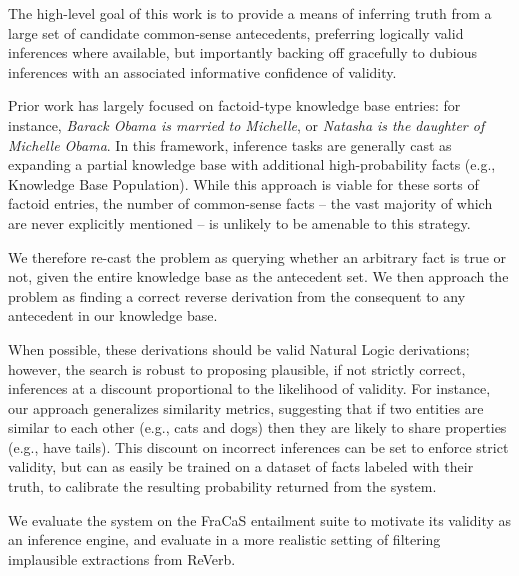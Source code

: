 The high-level goal of this work is to provide a means of inferring
  truth from a large set of candidate common-sense antecedents,
  preferring logically
  valid inferences where available, but importantly backing off
  gracefully to dubious inferences with an associated informative
  confidence of validity.

Prior work has largely focused on factoid-type knowledge base entries:
  for instance, \textit{Barack Obama is married to Michelle}, or
  \textit{Natasha is the daughter of Michelle Obama}.
In this framework, inference tasks are generally cast as expanding
  a partial knowledge base with additional high-probability facts
  (e.g., Knowledge Base Population).
While this approach is viable for these sorts of factoid entries,
  the number of common-sense facts -- the vast majority of which are
  never explicitly mentioned -- is unlikely to be amenable to this
  strategy.

We therefore re-cast the problem as querying whether an arbitrary fact
  is true or not, given the entire knowledge base as the
  antecedent set.
We then approach the problem as finding a correct reverse derivation
  from the consequent to any antecedent in our knowledge base.

When possible, these derivations should be valid Natural Logic derivations;
  however, the search is robust to proposing plausible, if not
  strictly correct, inferences at a discount proportional to the
  likelihood of validity.
For instance, our approach generalizes similarity metrics, suggesting
  that if two entities are similar to each other (e.g., cats and dogs)
  then they are likely to share properties (e.g., have tails).
This discount on incorrect inferences can be set to enforce strict
  validity, but can as easily be trained on a dataset of facts labeled
  with their truth, to calibrate the resulting probability returned
  from the system.

We evaluate the system on the FraCaS entailment suite to motivate its
  validity as an inference engine, and evaluate in a more realistic
  setting of filtering implausible extractions from ReVerb.

